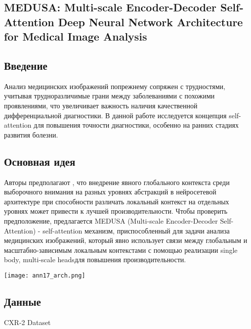 \subsection*{MEDUSA: Multi-scale Encoder-Decoder Self-Attention Deep Neural Network Architecture for Medical Image Analysis}

\subsection*{Введение}

Анализ медицинских изображений попрежнему сопряжен с трудностями, 
учитывая трудноразличимые грани между заболеваниями с похожими проявлениями, 
что увеличивает важность наличия качественной дифференциальной диагностики.
В данной работе исследуется концепция self-attention для повышения точности 
диагностики, особенно на ранних стадиях развития болезни.
\subsection*{Основная идея}
Авторы предполагают \cite{ann17}, что внедрение явного глобального контекста среди выборочного 
внимания на разных уровнях абстракций в нейросетевой архитектуре при способности различать 
локальный контекст на отдельных уровнях может привести к лучшей производительности.
Чтобы проверить предположение, предлагается MEDUSA (Multi-scale Encoder-Decoder Self-Attention) - 
self-attention механизм, приспособленный для задачи анализа медицинских изображений,
который явно использует связи между глобальным и масштабно-зависимым локальным контекстами 
с помощью реализации \glqq single body, multi-scale heads\grqq для повышения производительности.

\begin{minipage}{1.0\linewidth}
    \begin{center}
        \texttt{[image: ann17\_arch.png]} \\
    \end{center}
    
\end{minipage} 

\subsection*{Данные}
CXR-2 Dataset

